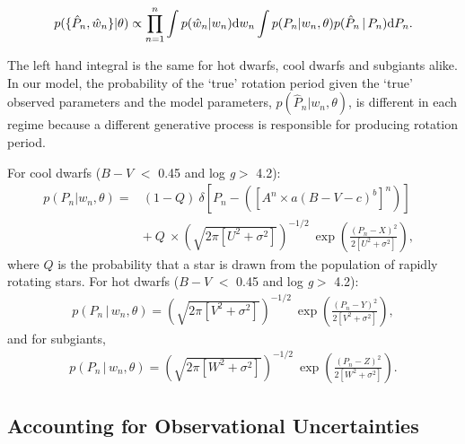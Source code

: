 \documentclass[10pt,preprint]{aastex}
\newcommand{\logg}{log \emph{g}}
\begin{document}
\begin{equation}
	p(\{\hat{P}_n,\hat{w}_n\}|\theta) \propto
	\prod_{n=1}^{n} \int p(\hat{w}_n|w_n) {\rm d}w_n \int p(P_n|w_n,\theta) p(\hat{P}_n\,|\,P_n) {\rm d}P_n.
\label{eq:fac}
\end{equation}

The left hand integral is the same for hot dwarfs, cool dwarfs and subgiants alike.
In our model, the probability of the `true' rotation period given the `true' observed parameters and the model parameters, $p(\hat{P}_n|w_n, \theta)$, is different in each regime because a different generative process is responsible for producing rotation period.

For cool dwarfs ($B-V$ $<$ 0.45 and \logg $>$ 4.2):
\begin{eqnarray}
p(P_n|w_n,\theta) =
	& (1-Q)~\delta \left [P_n - \left(\left[A^n \times a(B-V - c)^b\right]^n\right) \right] \quad \\
	& +~Q~\times \left(\sqrt{2\pi[U^2+\sigma^2]}\right)^{-1/2}~\exp\left({\frac{(P_n-X)^2}{2[U^2+\sigma^2]}}\right),
\end{eqnarray}
where $Q$ is the probability that a star is drawn from the population of rapidly rotating stars.
For hot dwarfs ($B-V$ $<$ 0.45 and \logg $>$ 4.2):
\begin{eqnarray}
p(P_n\,|\,w_n,\theta) = \left(\sqrt{2\pi[V^2+\sigma^2]}\right)^{-1/2}~\exp\left({\frac{(P_n-Y)^2}{2[V^2+\sigma^2]}}\right),
\end{eqnarray}
and for subgiants,
\begin{eqnarray}
p(P_n\,|\,w_n,\theta) = \left(\sqrt{2\pi[W^2+\sigma^2]}\right)^{-1/2}~\exp\left({\frac{(P_n-Z)^2}{2[W^2+\sigma^2]}}\right).
\end{eqnarray}

\subsection{Accounting for Observational Uncertainties}
\end{document}
